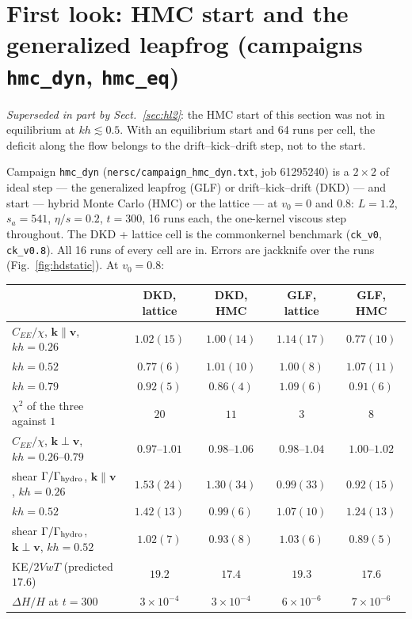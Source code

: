 \documentclass[11pt,aps,preprint,nofootinbib,superscriptaddress,tightenlines]{revtex4-2}
\def\Sect#1{Sect.~\ref{#1}}
\def\Fig#1{Fig.~\ref{#1}}
\begin{document}
\section{First look: HMC start and the generalized leapfrog (campaigns \texttt{hmc\_dyn}, \texttt{hmc\_eq})}
\label{sec:hmcdyn}

\emph{Superseded in part by \Sect{sec:hl2}}: the HMC start of this section was not in equilibrium at $kh\lesssim0.5$.  With an equilibrium
start and 64 runs per cell, the deficit along the flow belongs to the drift--kick--drift step, not to the start.

Campaign \texttt{hmc\_dyn} (\texttt{nersc/campaign\_hmc\_dyn.txt}, job 61295240) is a $2\times2$ of ideal step --- the generalized leapfrog (GLF) or
drift--kick--drift (DKD) --- and start --- hybrid Monte Carlo (HMC) or the lattice --- at $v_0=0$ and $0.8$: $L=1.2$, $s_a=541$, $\eta/s=0.2$,
$t=300$, 16 runs each, the one-kernel viscous step throughout.  The DKD + lattice cell is the commonkernel benchmark
(\texttt{ck\_v0}, \texttt{ck\_v0.8}).  All 16 runs of every cell are in.  Errors are jackknife over the runs (\Fig{fig:hdstatic}).  At $v_0=0.8$:
\begin{center}\small
\begin{tabular}{lcccc}
\hline
 & DKD, lattice & DKD, HMC & GLF, lattice & GLF, HMC \\ \hline
$C_{EE}/\chi$, $\bm k\parallel\bm v$, $kh=0.26$ & $1.02(15)$ & $1.00(14)$ & $1.14(17)$ & $0.77(10)$ \\
\phantom{$C_{EE}/\chi$, $\bm k\parallel\bm v$,} $kh=0.52$ & $0.77(6)$ & $1.01(10)$ & $1.00(8)$ & $1.07(11)$ \\
\phantom{$C_{EE}/\chi$, $\bm k\parallel\bm v$,} $kh=0.79$ & $0.92(5)$ & $0.86(4)$ & $1.09(6)$ & $0.91(6)$ \\
$\chi^2$ of the three against $1$ & $20$ & $11$ & $3$ & $8$ \\
$C_{EE}/\chi$, $\bm k\perp\bm v$, $kh=0.26$--$0.79$ & $0.97$--$1.01$ & $0.98$--$1.06$ & $0.98$--$1.04$ & $1.00$--$1.02$ \\
shear $\Gamma/\Gamma_{\rm hydro}$, $\bm k\parallel\bm v$, $kh=0.26$ & $1.53(24)$ & $1.30(34)$ & $0.99(33)$ & $0.92(15)$ \\
\phantom{shear $\Gamma/\Gamma_{\rm hydro}$, $\bm k\parallel\bm v$,} $kh=0.52$ & $1.42(13)$ & $0.99(6)$ & $1.07(10)$ & $1.24(13)$ \\
shear $\Gamma/\Gamma_{\rm hydro}$, $\bm k\perp\bm v$, $kh=0.52$ & $1.02(7)$ & $0.93(8)$ & $1.03(6)$ & $0.89(5)$ \\
KE$/2VwT$ (predicted $17.6$) & $19.2$ & $17.4$ & $19.3$ & $17.6$ \\
$\Delta H/H$ at $t=300$ & $3\times10^{-4}$ & $3\times10^{-4}$ & $6\times10^{-6}$ & $7\times10^{-6}$ \\
\hline
\end{tabular}
\end{center}
\end{document}
